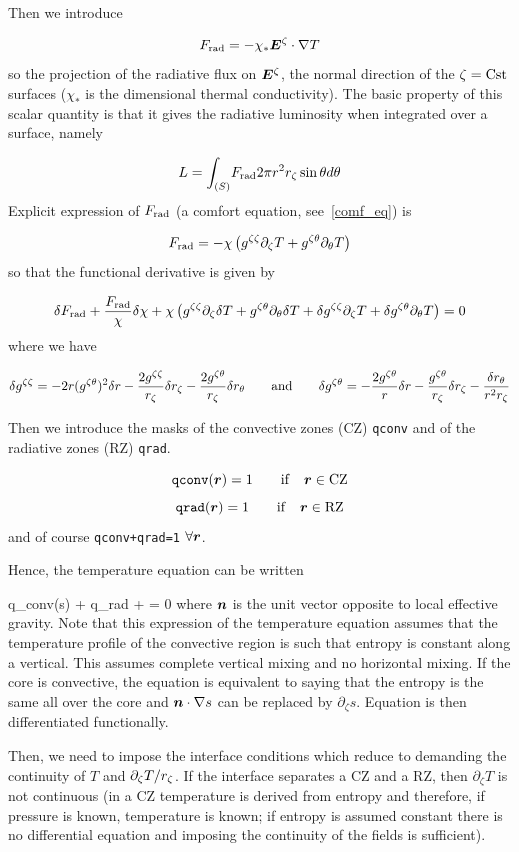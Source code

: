 Then we introduce

\[ \frad = -\chi_*\vE^\zeta\cdot\na T\]
so the projection of the radiative flux on $\vE^\zeta$, the normal
direction of the $\zeta={\rm Cst}$ surfaces ($\chi_*$ is the dimensional thermal
conductivity). The basic property of this
scalar quantity is that it gives the radiative luminosity when
integrated over a surface, namely

\[ L= \int_{(S)}\! F_{\rm rad} 2\pi r^2r_\zeta\sin\theta d\theta\]
Explicit expression of $F_{\rm rad}$  (a comfort equation, see~\ref{comf_eq}) is

\[ F_{\rm rad} = -\chi\left(g^{\zeta\zeta}\partial_\zeta T + g^{\zeta\theta}\partial_\theta T \right)\]
so that the functional derivative is given by

\[ \delta F_{\rm rad} +\frac{F_{\rm rad}}{\chi}\delta\chi +\chi\left(
g^{\zeta\zeta}\partial_\zeta\delta T + g^{\zeta\theta}\partial_\theta\delta T +
\delta g^{\zeta\zeta}\partial_\zeta T + \delta g^{\zeta\theta}\partial_\theta T\right) = 0\]
where we have

\[ \delta g^{\zeta\zeta} = -2r(g^{\zeta\theta})^2\delta r -\frac{2g^{\zeta\zeta}}{r_\zeta}\delta r_\zeta
-\frac{2g^{\zeta\theta}}{r_\zeta}\delta r_\theta\qquad {\rm and}\qquad
\delta g^{\zeta\theta} = -\frac{2g^{\zeta\theta}}{r}\delta r -\frac{g^{\zeta\theta}}{r_\zeta}\delta r_\zeta
-\frac{\delta r_\theta}{r^2r_\zeta}\]

Then we introduce the masks of the convective zones (CZ) {\tt qconv} and
of the radiative zones (RZ) {\tt qrad}.

\[ {\tt qconv}(\vr) = 1 \qquad {\rm if}\quad \vr \in {\rm CZ}\]
\[ {\tt qrad}(\vr) = 1 \qquad {\rm if}\quad \vr \in {\rm RZ}\]
and of course {\tt qconv+qrad=1} $\forall \vr$.

Hence, the temperature equation can be written

\beq q_{\rm conv}(\vn\cdot\na s) +  q_{\rm rad}\lp{} + \Lambda\rho\frac{\eps_*}{\chi_*}\rp = 0
where $\vn$ is the unit vector opposite to local effective gravity. Note
that this expression of the temperature equation assumes that the
temperature profile of the convective region is such that entropy is
constant along a vertical. This assumes complete vertical mixing and no
horizontal mixing. If the core is convective, the equation is equivalent
to saying that the entropy is the same all over the core and
$\vn\cdot\na s$ can be replaced by $\partial_\zeta s$. Equation
 is then differentiated functionally.

Then, we need to impose the interface conditions which reduce to
demanding the continuity of $T$ and $\partial_\zeta T/r_\zeta$. If the
interface separates a CZ and a RZ, then $\partial_\zeta T$ is not
continuous (in a CZ temperature is derived from entropy and therefore,
if pressure is known, temperature is known; if entropy is assumed
constant there is no differential equation and imposing the continuity
of the fields is sufficient).

